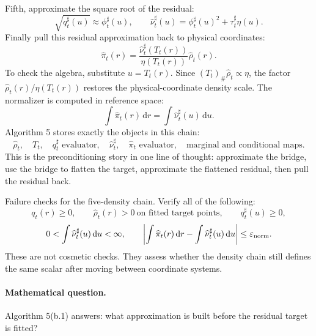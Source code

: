 \documentclass[11pt]{article}
\numberwithin{equation}{section}
\newcommand{\dd}{\,\mathrm d}
\begin{document}
Fifth, approximate the square root of the residual:
\begin{equation}
    \sqrt{q_t^\sharp(u)}\approx \phi_t^\sharp(u),
    \qquad
    \widehat\nu_t^\sharp(u)
    =
    \phi_t^\sharp(u)^2+\tau_t^\sharp\eta(u).
    \label{eq:p24-p7f}
\end{equation}
Finally pull this residual approximation back to physical coordinates:
\begin{equation}
    \widehat\pi_t(r)
    =
    \frac{\widehat\nu_t^\sharp(T_t(r))}
    {\eta(T_t(r))}
    \widehat\rho_t(r).
    \label{eq:p24-p7g}
\end{equation}
To check the algebra, substitute \(u=T_t(r)\).  Since
\((T_t)_\#\widehat\rho_t\propto\eta\), the factor
\(\widehat\rho_t(r)/\eta(T_t(r))\) restores the physical-coordinate density
scale.  The normalizer is computed in reference space:
\begin{equation}
    \int \widehat\pi_t(r)\dd r
    =
    \int \widehat\nu_t^\sharp(u)\dd u.
    \label{eq:p24-p7h}
\end{equation}
Algorithm 5 stores exactly the objects in this chain:
\begin{equation}
    \widehat\rho_t,\quad T_t,\quad q_t^\sharp\text{ evaluator},\quad
    \widehat\nu_t^\sharp,\quad \widehat\pi_t\text{ evaluator},\quad
    \text{marginal and conditional maps}.
    \label{eq:p24-p7i}
\end{equation}
This is the preconditioning story in one line of thought: approximate the
bridge, use the bridge to flatten the target, approximate the flattened
residual, then pull the residual back.

Failure checks for the five-density chain.  Verify all of the following:
\begin{equation}
    q_t(r)\ge0,\qquad
    \widehat\rho_t(r)>0\ \text{on fitted target points},\qquad
    q_t^\sharp(u)\ge0,
    \label{eq:p24-p7j}
\end{equation}
\begin{equation}
    0<\int\widehat\nu_t^\sharp(u)\dd u<\infty,\qquad
    \left|
    \int\widehat\pi_t(r)\dd r-\int\widehat\nu_t^\sharp(u)\dd u
    \right|
    \le \varepsilon_{\rm norm}.
    \label{eq:p24-p7k}
\end{equation}
These are not cosmetic checks.  They assess whether the density chain still
defines the same scalar after moving between coordinate systems.

\paragraph{Mathematical question.}
Algorithm 5(b.1) answers: what approximation is built before the residual
target is fitted?
\end{document}

